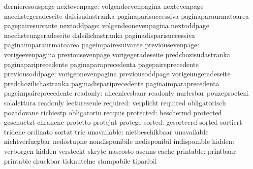                            dernieresouspage
             nextevenpage: volgendeevenpagina        nextevenpage
                           naechstegeradeseite       dalsisudastranka
                           paginaparisuccessiva      paginaparaurmatoarea
                           pagepairesuivante
              nextoddpage: volgendeonevenpagina      nextoddpage
                           naechsteungeradeseite     dalsilichastranka
                           paginadisparisuccessiva   paginaimparaurmatoarea
                           pageimpairesuivante
         previousevenpage: vorigeevenpagina          previousevenpage
                           vorigegeradeseite         predchozisudastranka
                           paginapariprecedente      paginaparaprecedenta
                           pagepaireprecedente
          previousoddpage: vorigeonevenpagina        previousoddpage
                           vorigeungeradeseite       predchozilichastranka
                           paginadispariprecedente   paginaimparaprecedenta
                           pageimpaireprecedente
                 readonly: alleenleesbaar            readonly
                           nurlesbar                 pouzeprocteni
                           solalettura               readonly
                           lectureseule
                 required: verplicht                 required
                           obligatorisch             pozadovane
                           richiestp                 obligatoriu
                           recquis
                protected: beschermd                 protected
                           geschuetzt                chranene
                           protetto                  protejat
                           protege
                   sorted: gesorteerd                sorted
                           sortiert                  tridene
                           ordinato                  sortat
                           trie
              unavailable: nietbeschikbaar           unavailable
                           nichtverfuegbar           nedostupne
                           nondisponibile            nedisponibil
                           indisponible
                   hidden: verborgen                 hidden
                           versteckt                 skryte
                           nascosto                  ascuns
                           cache
                printable: printbaar                 printable
                           druckbar                  tisknutelne
                           stampabile                tiparibil
